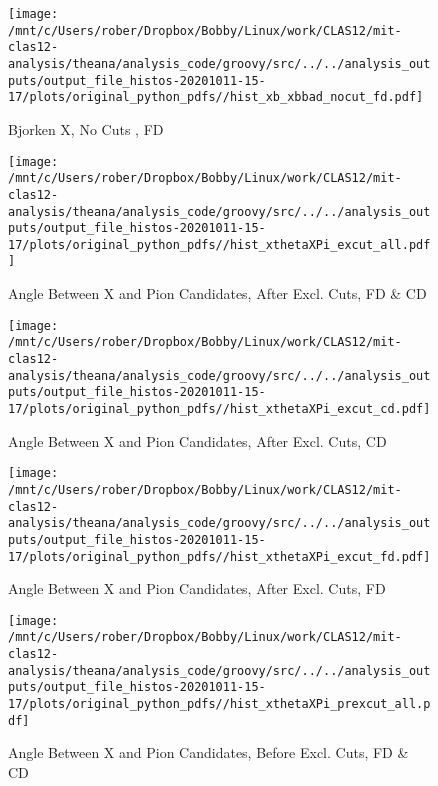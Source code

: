 \documentclass{article}
\begin{document}
\begin{landscape}
    \begin{figure}[h]
        \centering

        \texttt{[image: /mnt/c/Users/rober/Dropbox/Bobby/Linux/work/CLAS12/mit-clas12-analysis/theana/analysis\_code/groovy/src/../../analysis\_outputs/output\_file\_histos-20201011-15-17/plots/original\_python\_pdfs//hist\_xb\_xbbad\_nocut\_fd.pdf]}
        \captionsetup{textformat=empty,labelformat=blank}
        \caption{Bjorken X, No Cuts , FD}
    \end{figure}
    \clearpage
    
    \begin{figure}[h]
        \centering

        \texttt{[image: /mnt/c/Users/rober/Dropbox/Bobby/Linux/work/CLAS12/mit-clas12-analysis/theana/analysis\_code/groovy/src/../../analysis\_outputs/output\_file\_histos-20201011-15-17/plots/original\_python\_pdfs//hist\_xthetaXPi\_excut\_all.pdf]}
        \captionsetup{textformat=empty,labelformat=blank}
        \caption{Angle Between X and Pion Candidates, After Excl. Cuts, FD \& CD}
    \end{figure}
    \clearpage
    
    \begin{figure}[h]
        \centering

        \texttt{[image: /mnt/c/Users/rober/Dropbox/Bobby/Linux/work/CLAS12/mit-clas12-analysis/theana/analysis\_code/groovy/src/../../analysis\_outputs/output\_file\_histos-20201011-15-17/plots/original\_python\_pdfs//hist\_xthetaXPi\_excut\_cd.pdf]}
        \captionsetup{textformat=empty,labelformat=blank}
        \caption{Angle Between X and Pion Candidates, After Excl. Cuts, CD}
    \end{figure}
    \clearpage
    
    \begin{figure}[h]
        \centering

        \texttt{[image: /mnt/c/Users/rober/Dropbox/Bobby/Linux/work/CLAS12/mit-clas12-analysis/theana/analysis\_code/groovy/src/../../analysis\_outputs/output\_file\_histos-20201011-15-17/plots/original\_python\_pdfs//hist\_xthetaXPi\_excut\_fd.pdf]}
        \captionsetup{textformat=empty,labelformat=blank}
        \caption{Angle Between X and Pion Candidates, After Excl. Cuts, FD}
    \end{figure}
    \clearpage
    
    \begin{figure}[h]
        \centering

        \texttt{[image: /mnt/c/Users/rober/Dropbox/Bobby/Linux/work/CLAS12/mit-clas12-analysis/theana/analysis\_code/groovy/src/../../analysis\_outputs/output\_file\_histos-20201011-15-17/plots/original\_python\_pdfs//hist\_xthetaXPi\_prexcut\_all.pdf]}
        \captionsetup{textformat=empty,labelformat=blank}
        \caption{Angle Between X and Pion Candidates, Before Excl. Cuts, FD \& CD}
    \end{figure}
    \clearpage
    

\end{landscape}
\end{document}
